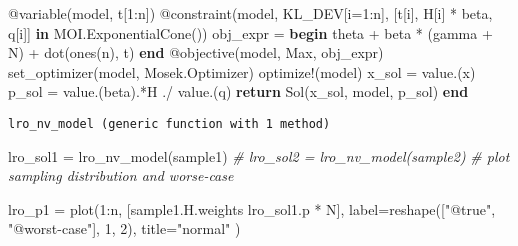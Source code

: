 \documentclass[
  10pt,
  a4paper,
,tablecaptionabove
]{scrartcl}
\newenvironment{Shaded}{}{}
\newcommand{\CommentTok}[1]{\textcolor[rgb]{0.38,0.63,0.69}{\textit{#1}}}
\newcommand{\FloatTok}[1]{\textcolor[rgb]{0.25,0.63,0.44}{#1}}
\newcommand{\KeywordTok}[1]{\textcolor[rgb]{0.00,0.44,0.13}{\textbf{#1}}}
\newcommand{\NormalTok}[1]{#1}
\newcommand{\OperatorTok}[1]{\textcolor[rgb]{0.40,0.40,0.40}{#1}}
\newcommand{\PreprocessorTok}[1]{\textcolor[rgb]{0.74,0.48,0.00}{#1}}
\newcommand{\StringTok}[1]{\textcolor[rgb]{0.25,0.44,0.63}{#1}}
\begin{document}
\begin{Shaded}
\begin{Highlighting}[]
    \PreprocessorTok{@variable}\NormalTok{(model}\OperatorTok{,}\NormalTok{ t[}\FloatTok{1}\OperatorTok{:}\NormalTok{n])}
    \PreprocessorTok{@constraint}\NormalTok{(model}\OperatorTok{,}\NormalTok{ KL\_DEV[i}\OperatorTok{=}\FloatTok{1}\OperatorTok{:}\NormalTok{n]}\OperatorTok{,}\NormalTok{ [t[i]}\OperatorTok{,}\NormalTok{ H[i] }\OperatorTok{*}\NormalTok{ beta}\OperatorTok{,}\NormalTok{ q[i]] }\KeywordTok{in}\NormalTok{ MOI.ExponentialCone())}
\NormalTok{    obj\_expr }\OperatorTok{=} 
    \KeywordTok{begin}
\NormalTok{        theta }\OperatorTok{+}\NormalTok{ beta }\OperatorTok{*}\NormalTok{ (gamma }\OperatorTok{+}\NormalTok{ N) }\OperatorTok{+}\NormalTok{ dot(ones(n)}\OperatorTok{,}\NormalTok{ t)}
    \KeywordTok{end}
    \PreprocessorTok{@objective}\NormalTok{(model}\OperatorTok{,}\NormalTok{ Max}\OperatorTok{,}\NormalTok{ obj\_expr)}
\NormalTok{    set\_optimizer(model}\OperatorTok{,}\NormalTok{ Mosek.Optimizer)}
\NormalTok{    optimize}\OperatorTok{!}\NormalTok{(model)}
\NormalTok{    x\_sol }\OperatorTok{=}\NormalTok{ value.(x)}
\NormalTok{    p\_sol }\OperatorTok{=}\NormalTok{ value.(beta)}\OperatorTok{.*}\NormalTok{H }\OperatorTok{./}\NormalTok{ value.(q)}
    \KeywordTok{return}\NormalTok{ Sol(x\_sol}\OperatorTok{,}\NormalTok{ model}\OperatorTok{,}\NormalTok{ p\_sol)}
\KeywordTok{end}
\end{Highlighting}
\end{Shaded}

\begin{verbatim}
lro_nv_model (generic function with 1 method)
\end{verbatim}

\begin{Shaded}
\begin{Highlighting}[]
\NormalTok{lro\_sol1 }\OperatorTok{=}\NormalTok{ lro\_nv\_model(sample1)}
\CommentTok{\# lro\_sol2 = lro\_nv\_model(sample2)}
\CommentTok{\# plot sampling distribution and worse{-}case}


\NormalTok{lro\_p1 }\OperatorTok{=}\NormalTok{ plot(}\FloatTok{1}\OperatorTok{:}\NormalTok{n}\OperatorTok{,}\NormalTok{ [sample1.H.weights lro\_sol1.p }\OperatorTok{*}\NormalTok{ N]}\OperatorTok{,}
\NormalTok{    label}\OperatorTok{=}\NormalTok{reshape([}\StringTok{"@true"}\OperatorTok{,} \StringTok{"@worst{-}case"}\NormalTok{]}\OperatorTok{,} \FloatTok{1}\OperatorTok{,} \FloatTok{2}\NormalTok{)}\OperatorTok{,}
\NormalTok{    title}\OperatorTok{=}\StringTok{"normal"}
\NormalTok{)}
\end{Highlighting}
\end{Shaded}
\end{document}
